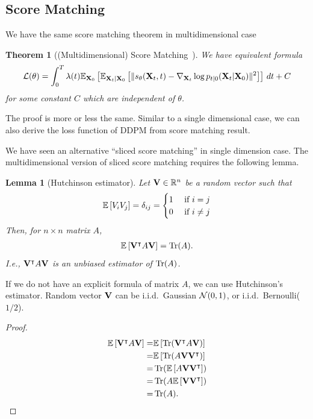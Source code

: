\documentclass[11pt]{article}
\newtheorem{theorem}{Theorem}
\newtheorem{lemma}{Lemma}
\begin{document}
\subsection{Score Matching}
We have the same score matching theorem in multidimensional case
\begin{theorem}[(Multidimensional) Score Matching~\cite{vincent2011connection}]
    We have equivalent formula
    \begin{align}
        {\cal L}(\theta) = \int_0^T \lambda(t) \mathbb{E}_{{\bf X}_0}\left[\mathbb{E}_{{\bf X}_t|{\bf X}_0}\left[ \| s_\theta({\bf X}_t, t)  - \nabla_{{\bf X}_t} \log p_{t|0}({\bf X}_t|{\bf X}_0)\|^2 \right]\right]\, dt + C
    \end{align}
    for some constant $C$ which are independent of $\theta$.
\end{theorem}
The proof is more or less the same.
Similar to a single dimensional case, we can also derive the loss function of DDPM from score matching result.

We have seen an alternative ``sliced score matching'' in single dimension case.
The multidimensional version of sliced score matching requires the following lemma.
\begin{lemma}[Hutchinson estimator]
    Let ${\bf V}\in\mathbb{R}^n$ be a random vector such that
    \begin{align}
        \Expec{V_i V_j} = \delta_{ij} = \begin{cases}
            1 &\mbox{ if $i=j$}\\
            0 &\mbox{ if $i\neq j$}
        \end{cases}
    \end{align}
    Then, for $n\times n$ matrix $A$,
    \begin{align}
        \Expec{\bV^\intercal A \bV} = \Tr(A).
    \end{align}
    I.e., ${\bf V}^\intercal A {\bf V} $  is an unbiased estimator of $\operatorname{Tr}(A)$.
\end{lemma}
If we do not have an explicit formula of matrix $A$, we can use Hutchinson's estimator.
Random vector ${\bf V}$ can be i.i.d.~Gaussian ${\cal N}(0, 1)$, or i.i.d.~Bernoulli($1/2$).
\begin{proof}
\begin{align}
        \Expec{\bV^\intercal A \bV} =& \Expec{\Tr(\bV^\intercal A \bV)} \\
        =& \Expec{\Tr(A \bV\bV^\intercal )} \\
        =& \Tr(\Expec{A \bV\bV^\intercal }) \\
        =& \Tr(A\Expec{\bV\bV^\intercal }) \\
        =& \Tr(A).
\end{align}
\end{proof}
\end{document}
